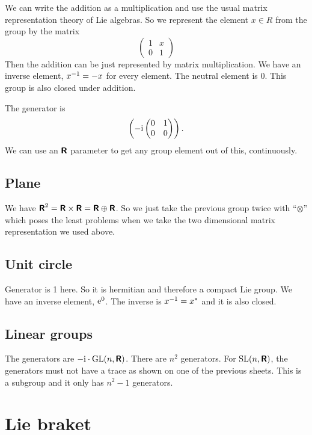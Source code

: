 \documentclass[11pt, english, fleqn, DIV=15, headinclude, BCOR=1cm]{scrartcl}
\begin{document}
We can write the addition as a multiplication and use the usual matrix
representation theory of Lie algebras. So we represent the element $x \in R$
from the group by the matrix
\[
    \begin{pmatrix}
        1 & x \\ 0 & 1
    \end{pmatrix}
\]
Then the addition can be just represented by matrix multiplication. We have an
inverse element, $x^{-1} = -x$ for every element. The neutral element is 0. This
group is also closed under addition.

The generator is
\[
    \begin{pmatrix}
        - \mathrm i
        \begin{pmatrix}
            0 & 1 \\ 0 & 0
        \end{pmatrix}
    \end{pmatrix}.
\]
We can use an $\text{\bfseries\sffamily R}$ parameter to get any group element out of this,
continuously.

\subsection{Plane}

We have $\text{\bfseries\sffamily R}^2 = \text{\bfseries\sffamily R} \times \text{\bfseries\sffamily R} = \text{\bfseries\sffamily R} \oplus \text{\bfseries\sffamily R}$. So we just take the previous
group twice with “$\otimes$” which poses the least problems when we take the
two dimensional matrix representation we used above.

\subsection{Unit circle}

Generator is 1 here. So it is hermitian and therefore a compact Lie group. We
have an inverse element, $\mathrm e^0$. The inverse is $x^{-1} = x^*$ and it is also
closed.

\subsection{Linear groups}

The generators are $- \mathrm i \cdot \mathrm{GL}(n, \text{\bfseries\sffamily R})$. There are $n^2$
generators. For $\mathrm{SL}(n, \text{\bfseries\sffamily R})$, the generators must not have a trace as
shown on one of the previous sheets. This is a subgroup and it only has $n^2 -
1$ generators.

\section{Lie braket}
\label{homework:2}
\end{document}
